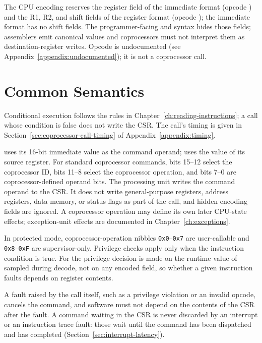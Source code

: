 \noindent The CPU encoding reserves the register field of the immediate format (opcode ) and the R1, R2, and shift
fields of the register format (opcode ); the immediate format has no shift fields. The programmer-facing
 and  syntax hides those fields; assemblers emit canonical values and coprocessors must
not interpret them as destination-register writes. Opcode  is undocumented (see
Appendix~\ref{appendix:undocumented}); it is not a coprocessor call.

\section{Common Semantics}

Conditional execution follows the rules in Chapter~\ref{ch:reading-instructions}; a call whose condition is false does
not write the CSR. The call's timing is given in Section~\ref{sec:coprocessor-call-timing} of
Appendix~\ref{appendix:timing}.

 uses its 16-bit immediate value as the command operand;  uses the value of its source
register. For standard coprocessor commands, bits 15--12 select the coprocessor ID, bits 11--8 select the coprocessor
operation, and bits 7--0 are coprocessor-defined operand bits. The processing unit writes the command operand to the CSR.
It does not write general-purpose registers, address registers, data memory, or status flags as part of the call, and
hidden encoding fields are ignored. A coprocessor operation may define its own later CPU-state effects; exception-unit
effects are documented in Chapter~\ref{ch:exceptions}.

In protected mode, coprocessor-operation nibbles \texttt{0x0}--\texttt{0x7} are user-callable and
\texttt{0x8}--\texttt{0xF} are supervisor-only. Privilege checks apply only when the instruction condition is true. For
 the privilege decision is made on the runtime value of  sampled during decode, not on any
encoded field, so whether a given  instruction faults depends on register contents.

A fault raised by the call itself, such as a privilege violation or an invalid opcode, cancels the command, and
software must not depend on the contents of the CSR after the fault. A command waiting in the CSR is never discarded by
an interrupt or an instruction trace fault: those wait until the command has been dispatched and has completed
(Section~\ref{sec:interrupt-latency}).

